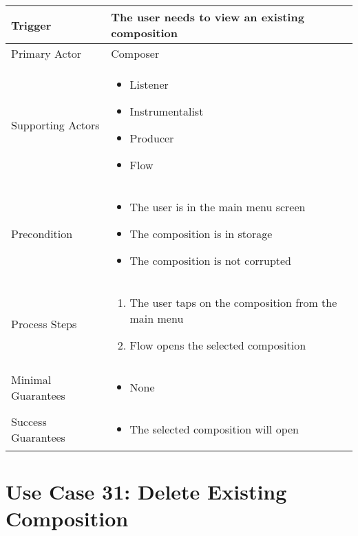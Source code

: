   \begin{tabularx}{\textwidth}{|X|X|}
  \hline
  Trigger & 
  The user needs to view an existing composition \\
  \hline
  Primary Actor & 
  Composer \\
  \hline
  Supporting Actors & 
  \begin{itemize}
  \item Listener
  \item Instrumentalist
  \item Producer
  \item Flow
  \end{itemize} \\
  \hline
  Precondition & 
  \begin{itemize}
  \item The user is in the main menu screen
  \item The composition is in storage
  \item The composition is not corrupted
  \end{itemize} \\
  \hline
  Process Steps & 
  \begin{enumerate}
  \item The user taps on the composition from the main menu
  \item Flow opens the selected composition
  \end{enumerate} \\
  \hline
  Minimal Guarantees & 
  \begin{itemize}
    \item None
  \end{itemize} \\
  \hline
  Success Guarantees & 
  \begin{itemize}
    \item The selected composition will open
  \end{itemize} \\
  \hline
  \end{tabularx}

  \section{Use Case 31: Delete Existing Composition}

